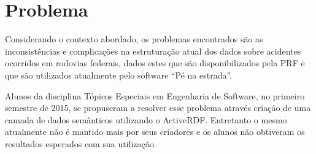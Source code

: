 \section{Problema}

Considerando o contexto abordado, os problemas encontrados são as inconsistências e
complicações na estruturação atual dos dados sobre acidentes ocorridos em rodovias
federais, dados estes que são disponibilizados pela PRF e que são utilizados atualmente
pelo software “Pé na estrada”.

	Alunos da disciplina Tópicos Especiais em Engenharia de Software, no primeiro semestre de 2015, se propuseram a resolver esse problema através criação de uma camada de dados semânticos utilizando o ActiveRDF. Entretanto o mesmo atualmente não é mantido mais por seus criadores e os alunos não obtiveram os resultados esperados com sua utilização. 